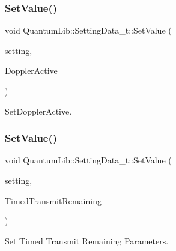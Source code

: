 \subsubsection{\texorpdfstring{Set\+Value()}{SetValue()}\hspace{0.1cm}{\footnotesize\ttfamily [21/26]}}
{\footnotesize\ttfamily void Quantum\+Lib\+::\+Setting\+Data\+\_\+t\+::\+Set\+Value (\begin{DoxyParamCaption}\item[{\mbox{\hyperlink{namespace_quantum_lib_acc8124e3e65bca4aa798d03a55e3d54c}{e\+Settings\+\_\+t}}}]{setting,  }\item[{\mbox{\hyperlink{namespace_quantum_lib_a7a034f49c93f16195096c2ecf89432d4}{e\+Doppler\+Active\+\_\+t}}}]{Doppler\+Active }\end{DoxyParamCaption})\hspace{0.3cm}{\ttfamily [inline]}}



Set\+Doppler\+Active. 

\mbox{\label{struct_quantum_lib_1_1_setting_data__t_a7591b7ec9a3de4b08d00ffa60571f3c7}} 
\subsubsection{\texorpdfstring{Set\+Value()}{SetValue()}\hspace{0.1cm}{\footnotesize\ttfamily [22/26]}}
{\footnotesize\ttfamily void Quantum\+Lib\+::\+Setting\+Data\+\_\+t\+::\+Set\+Value (\begin{DoxyParamCaption}\item[{\mbox{\hyperlink{namespace_quantum_lib_acc8124e3e65bca4aa798d03a55e3d54c}{e\+Settings\+\_\+t}}}]{setting,  }\item[{\mbox{\hyperlink{struct_quantum_lib_1_1_timed_transmit_remaining__t}{Timed\+Transmit\+Remaining\+\_\+t}} \&}]{Timed\+Transmit\+Remaining }\end{DoxyParamCaption})\hspace{0.3cm}{\ttfamily [inline]}}



Set Timed Transmit Remaining Parameters. 

\mbox{\label{struct_quantum_lib_1_1_setting_data__t_af399900443730ee2ad105de5c136b53e}} 
